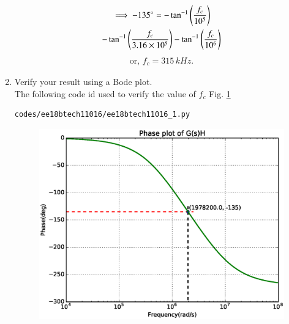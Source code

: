 \begin{enumerate}[label=\arabic*.,ref=\theenumi]

\begin{multline}
\implies -135\degree = -\tan^{-1}\left(\frac{f_{c}}{10^5}\right)
\\
-\tan^{-1}\left(\frac{f_{c}}{3.16\times10^5}\right)-\tan^{-1}\left(\frac{f_{c}}{10^6}\right)
\end{multline}
\begin{align}
\text{or, }f_{c} = 315 \, kHz.
\label{eq:ee18btech11016_fc}
\end{align}

\item Verify your result using a Bode plot.
\\
\solution  The following code  id used to verify the value of $f_{c}$ Fig. \ref{fig:ee18btech11016_1}

\begin{lstlisting}
codes/ee18btech11016/ee18btech11016_1.py
\end{lstlisting}
%
\begin{figure}[!h]
\centering
\includegraphics[width=\columnwidth]{./figs/ee18btech11016/ee18btech11016_resultbode.eps}
\caption{}
\label{fig:ee18btech11016_1}
\end{figure}


\end{enumerate}
